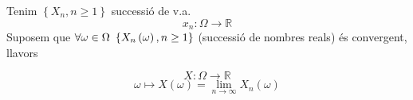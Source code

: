 \documentclass[../main.tex]{subfiles}
\begin{document}
    \begin{proposicio}
        Tenim $\left\{X_n, n\geq 1\right\}$ successió de v.a.\\
        \begin{displaymath}
            x_n: \Omega \to \mathbb{R}
        \end{displaymath} 
        Suposem que $\forall \omega \in \Omega \hbox{ } \left\{X_n\left(\omega\right) , n\geq 1\right\}$
        (successió de nombres reals) és convergent, llavors
        \begin{definicio}
            \begin{displaymath}
                X: \Omega \to \mathbb{R}
            \end{displaymath}
            \begin{displaymath}
                \omega \longmapsto X\left(\omega\right) = \lim\limits_{n \to \infty} X_n \left(\omega\right) 
            \end{displaymath}
        \end{definicio}
    \end{proposicio}
\end{document}
